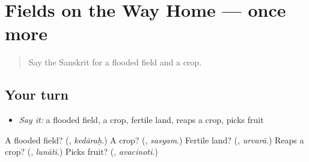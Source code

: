 \section[(dialogue)]{Fields on the Way Home — once more}

\label{lesson:SA-R447-review-final-447}



\begin{quote}
Say the Sanskrit for a flooded field and a crop.
\end{quote}

\subsection*{Your turn}
\begin{itemize}
\raggedright
  \item \emph{Say it:} a flooded field, a crop, fertile land, reaps a crop, picks fruit
\end{itemize}

\begin{tcolorbox}[breakable,colback=teal!4,colframe=teal!35!black,title={Before you move on}]
A flooded field? (\textbf{}, \emph{kedāraḥ}.) A crop? (\textbf{}, \emph{sasyam}.) Fertile land? (\textbf{}, \emph{urvarā}.) Reaps a crop? (\textbf{}, \emph{lunāti}.) Picks fruit? (\textbf{}, \emph{avacinoti}.)
\end{tcolorbox}
